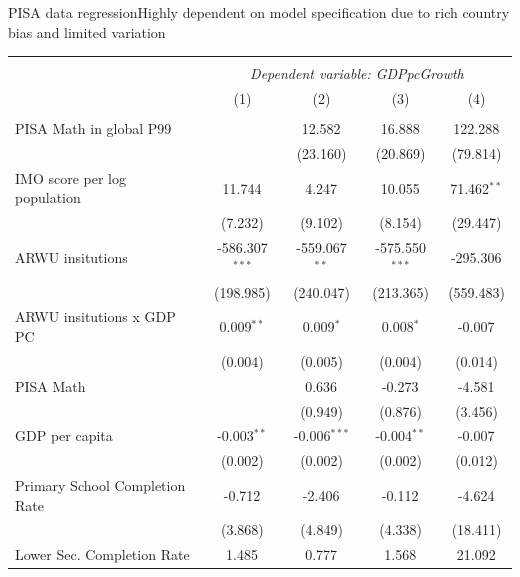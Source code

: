 \documentclass[10pt]{beamer}
\begin{document}
\begin{frame}{PISA data regression}{Highly dependent on model specification due to rich country bias and limited variation}
    \begin{table}[!htbp] \centering
        \resizebox{\linewidth}{!} {
            \begin{tabular}{@{\extracolsep{2pt}}lcccc}
                \\[-1.8ex]\hline
                \hline \\[-1.8ex]
                & \multicolumn{4}{c}{\textit{Dependent variable: GDPpcGrowth}} \
                \cr \cline{2-5}
                \\[-1.8ex] & (1) & (2) & (3) & (4) \\
                \hline \\[-1.8ex]
                 PISA Math in global P99 & & 12.582$^{}$ & 16.888$^{}$ & 122.288$^{}$ \\
                & & (23.160) & (20.869) & (79.814) \\
                 IMO score per log population & 11.744$^{}$ & 4.247$^{}$ & 10.055$^{}$ & 71.462$^{**}$ \\
                & (7.232) & (9.102) & (8.154) & (29.447) \\
                 ARWU insitutions & -586.307$^{***}$ & -559.067$^{**}$ & -575.550$^{***}$ & -295.306$^{}$ \\
                & (198.985) & (240.047) & (213.365) & (559.483) \\
                 ARWU insitutions x GDP PC & 0.009$^{**}$ & 0.009$^{*}$ & 0.008$^{*}$ & -0.007$^{}$ \\
                & (0.004) & (0.005) & (0.004) & (0.014) \\
                 PISA Math & & 0.636$^{}$ & -0.273$^{}$ & -4.581$^{}$ \\
                & & (0.949) & (0.876) & (3.456) \\
                 GDP per capita & -0.003$^{**}$ & -0.006$^{***}$ & -0.004$^{**}$ & -0.007$^{}$ \\
                & (0.002) & (0.002) & (0.002) & (0.012) \\
                 Primary School Completion Rate & -0.712$^{}$ & -2.406$^{}$ & -0.112$^{}$ & -4.624$^{}$ \\
                & (3.868) & (4.849) & (4.338) & (18.411) \\
                 Lower Sec. Completion Rate & 1.485$^{}$ & 0.777$^{}$ & 1.568$^{}$ & 21.092$^{}$ \\

\end{tabular}}
\end{table}
\end{frame}
\end{document}
